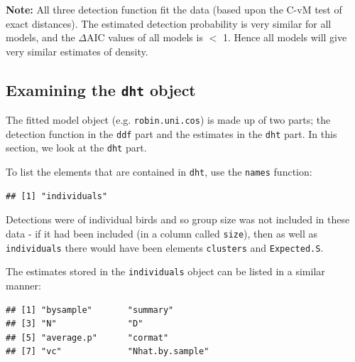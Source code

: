 \documentclass[10pt,a4paper]{tufte-handout}
\newenvironment{Shaded}{\begin{snugshade}}{\end{snugshade}}
\newcommand{\KeywordTok}[1]{\textcolor[rgb]{0.13,0.29,0.53}{\textbf{#1}}}
\newcommand{\NormalTok}[1]{#1}
\newcommand{\OperatorTok}[1]{\textcolor[rgb]{0.81,0.36,0.00}{\textbf{#1}}}
\begin{document}
\begin{marginfigure}
\textbf{Note:} All three detection function fit the data (based upon the
C-vM test of exact distances). The estimated detection probability is
very similar for all models, and the \(\Delta\)AIC values of all models
is \(<\) 1. Hence all models will give very similar estimates of
density.
\end{marginfigure}

\hypertarget{examining-the-dht-object}{%
\subsection{\texorpdfstring{Examining the \texttt{dht}
object}{Examining the dht object}}\label{examining-the-dht-object}}

The fitted model object (e.g. \texttt{robin.uni.cos}) is made up of two
parts; the detection function in the \texttt{ddf} part and the estimates
in the \texttt{dht} part. In this section, we look at the \texttt{dht}
part.

To list the elements that are contained in \texttt{dht}, use the
\texttt{names} function:

\begin{Shaded}
\end{Shaded}

\begin{verbatim}
## [1] "individuals"
\end{verbatim}

Detections were of individual birds and so group size was not included
in these data - if it had been included (in a column called
\texttt{size}), then as well as \texttt{individuals} there would have
been elements \texttt{clusters} and \texttt{Expected.S}.

The estimates stored in the \texttt{individuals} object can be listed in
a similar manner:

\begin{Shaded}
\end{Shaded}

\begin{verbatim}
## [1] "bysample"       "summary"       
## [3] "N"              "D"             
## [5] "average.p"      "cormat"        
## [7] "vc"             "Nhat.by.sample"
\end{verbatim}
\end{document}
